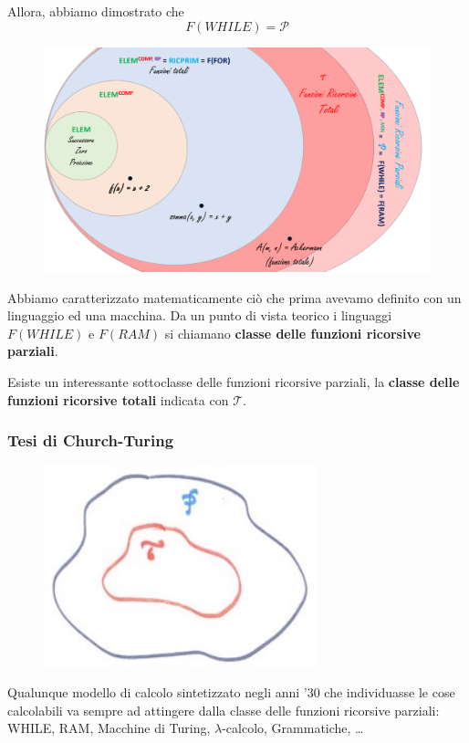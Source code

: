 \documentclass{article}
\begin{document}
Allora, abbiamo dimostrato che
$$F(WHILE)=\mathcal{P}$$
\begin{figure}[H]
    \centering
    \includegraphics[scale=0.4]{images/situazione_funz.png}
\end{figure}
Abbiamo caratterizzato matematicamente ciò che prima avevamo definito con un linguaggio
ed una macchina. Da un punto di vista teorico i linguaggi $F(WHILE)$ e $F(RAM)$ si chiamano
\textbf{classe delle funzioni ricorsive parziali}.

Esiste un interessante sottoclasse delle funzioni ricorsive parziali, la \textbf{classe
    delle funzioni ricorsive totali} indicata con $\mathcal{T}$.

\subsubsection{Tesi di Church-Turing}
\begin{figure}[H]
    \centering
    \includegraphics[scale=0.5]{images/church-turing.png}
\end{figure}
Qualunque modello di calcolo sintetizzato negli anni '30 che individuasse le cose
calcolabili va sempre ad attingere dalla classe delle funzioni ricorsive parziali:
WHILE, RAM, Macchine di Turing, $\lambda$-calcolo, Grammatiche, \dots
\end{document}
